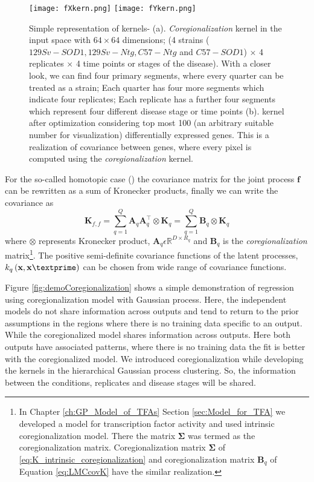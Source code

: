 \begin{figure}
 \begin{center}
  \texttt{[image: fXkern.png]}
  \texttt{[image: fYkern.png]}
  \caption {Simple representation of kernels- (a). \emph{Coregionalization} kernel in the input space  with $64\times64$ dimensions; (4 strains ($129Sv-SOD1, 129Sv-Ntg, C57-Ntg$ and $C57-SOD1$) $\times$ 4 replicates $\times$ 4 time points or stages of the disease). With a closer look, we can find four primary segments, where every quarter can be treated as a strain; Each quarter has four more segments which indicate four replicates; Each replicate has a further four segments which represent four different disease stage or time points (b). kernel after optimization considering top most 100 (an arbitrary suitable number for visualization) differentially expressed genes. This is a realization of covariance between genes, where every pixel is computed using the \emph{coregionalization} kernel.
  \label{fig:kernel}}
 \end{center}
\end{figure}

For the so-called homotopic case (\cite{Alvarez:2011, Wackernagel:2003}) the covariance matrix for the joint process $\textbf{f}$ can be rewritten as a sum of Kronecker products, finally we can write the covariance as
\begin{equation} \label{eq:LMCcovK}
\textbf{K}_{f,f}=\sum\limits_{q=1}^Q \textbf{A}_q\textbf{A}^{\top}_q \otimes \textbf{K}_q
=\sum\limits_{q=1}^Q \textbf{B}_q \otimes \textbf{K}_q
\end{equation}
where $\otimes$ represents Kronecker product, $\textbf{A}_q \epsilon \mathbb{R}^{D\times R_q}$ and $\textbf{B}_q$ is the \emph{coregionalization} matrix\footnote{In Chapter \ref{ch:GP_Model_of_TFAs} Section \ref{sec:Model_for_TFA} we developed a model for transcription factor activity and used intrinsic coregionalization model. There the matrix $\boldsymbol{\Sigma}$ was termed as the coregionalization matrix. Coregionalization matrix $\boldsymbol{\Sigma}$ of \ref{eq:K_intrinsic_coregionalization} and coregionalization matrix $\textbf{B}_q$ of Equation \ref{eq:LMCcovK} have the similar realization.}. The positive semi-definite covariance functions of the latent processes, $k_q\left(\textbf{x},\textbf{x}\textprime\right)$ can be chosen from wide range of covariance functions. 

Figure \ref{fig:demoCoregionalization} shows a simple demonstration of regression using coregionalization model with Gaussian process. Here, the independent models do not share information across outputs and tend to return to the prior assumptions in the regions where there is no training data specific to an output. While the coregionalized model shares information across outputs. Here both outputs have associated patterns, where there is no training data the fit is better with the coregionalized model. We introduced coregionalization while developing the kernels in the hierarchical Gaussian process clustering. So, the information between the conditions, replicates and disease stages will be shared. 

